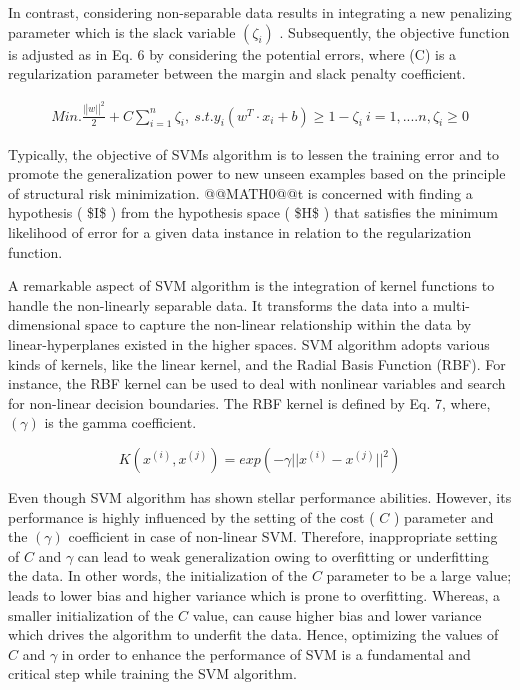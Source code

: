 In contrast, considering non-separable data results in integrating a new penalizing parameter which is the slack variable $(\zeta_{i})$ . Subsequently, the objective function is adjusted as in Eq. 6 by considering the potential errors, where (C) is a regularization parameter between the margin and slack penalty coefficient.

\begin{equation}
\begin{array}{c}{{M i n.\frac{\lvert|w\rvert|^{2}}{2}+C\displaystyle\sum_{i=1}^{n}\zeta_{i},}}\ {{s.t.y_{i}(w^{T}\cdot x_{i}+b)\geq1-\zeta_{i}}}\ {{i=1,....n,\zeta_{i}\geq0}}\end{array}
\end{equation}

Typically, the objective of SVMs algorithm is to lessen the training error and to promote the generalization power to new unseen examples based on the principle of structural risk minimization. @@MATH0@@t is concerned with finding a hypothesis ( \$I\$ ) from the hypothesis space ( \$H\$ ) that satisfies the minimum likelihood of error for a given data instance in relation to the regularization function.

A remarkable aspect of SVM algorithm is the integration of kernel functions to handle the non-linearly separable data. It transforms the data into a multi-dimensional space to capture the non-linear relationship within the data by linear-hyperplanes existed in the higher spaces. SVM algorithm adopts various kinds of kernels, like the linear kernel, and the Radial Basis Function (RBF). For instance, the RBF kernel can be used to deal with nonlinear variables and search for non-linear decision boundaries. The RBF kernel is defined by Eq. 7, where, $(\gamma)$ is the gamma coefficient.

\begin{equation}
K(x^{(i)},x^{(j)})=e x p(-\gamma||x^{(i)}-x^{(j)}||^{2})
\end{equation}

Even though SVM algorithm has shown stellar performance abilities. However, its performance is highly influenced by the setting of the cost ( $C$ ) parameter and the $(\gamma)$ coefficient in case of non-linear SVM. Therefore, inappropriate setting of $C$ and $\gamma$ can lead to weak generalization owing to overfitting or underfitting the data. In other words, the initialization of the $C$ parameter to be a large value; leads to lower bias and higher variance which is prone to overfitting. Whereas, a smaller initialization of the $C$ value, can cause higher bias and lower variance which drives the algorithm to underfit the data. Hence, optimizing the values of $C$ and $\gamma$ in order to enhance the performance of SVM is a fundamental and critical step while training the SVM algorithm.

